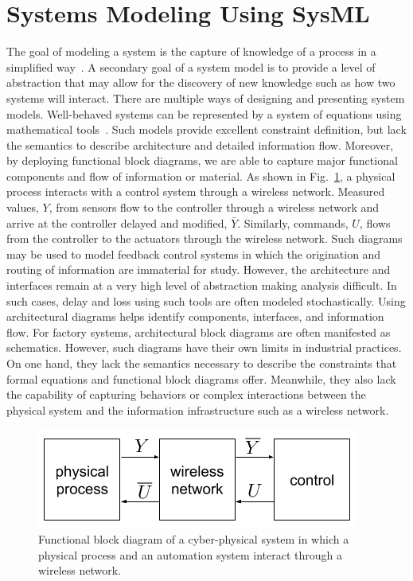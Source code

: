 \section{Systems Modeling Using SysML}\label{sysml:sec:systemsmodeling}

The goal of modeling a system is the capture of knowledge of a process in a simplified way~\cite{SysModel2004}. A secondary goal of a system model is to provide a level of abstraction that may allow for the discovery of new knowledge such as how two systems will interact. There are multiple ways of designing and presenting system models. Well-behaved systems can be represented by a system of equations using mathematical tools~\cite{SimModel1999}. Such models provide excellent constraint definition, but lack the semantics to describe architecture and detailed information flow.
Moreover, by deploying functional block diagrams, we are able to capture major functional components and flow of information or material. As shown in Fig.~\ref{sysml:fig:fbd-system}, a physical process interacts with a control system through a wireless network.  Measured values, $Y$, from sensors flow to the controller through a wireless network and arrive at the controller delayed and modified, $\bar{Y}$. Similarly, commands, $U$, flows from the controller to the actuators through the wireless network. Such diagrams may be used to model feedback control systems in which the origination and routing of information are immaterial for study. However, the architecture and interfaces remain at a very high level of abstraction making analysis difficult. In such cases, delay and loss using such tools are often modeled stochastically. Using architectural diagrams helps identify components, interfaces, and information flow. For factory systems, architectural block diagrams are often manifested as schematics. However, such diagrams have their own limits in industrial practices. On one hand, they lack the semantics necessary to describe the constraints that formal equations and functional block diagrams offer. Meanwhile, they also lack the capability of capturing behaviors or complex interactions between the physical system and the information infrastructure such as a wireless network. 

\begin{figure}
	\centering
	\includegraphics[width=0.65\columnwidth]{./chapter-sysml/diagrams/fbd-system}
	\caption{Functional block diagram of a cyber-physical system in which a physical process and an automation system interact through a wireless network.}
	\label{sysml:fig:fbd-system}
\end{figure}

